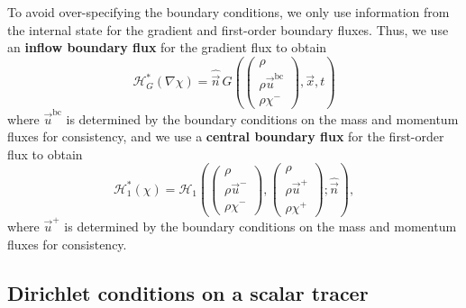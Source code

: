 \documentclass{report}
\numberwithin{equation}{section}
\begin{document}
To avoid over-specifying the boundary conditions, we only use information from the internal state for the gradient and first-order boundary fluxes. Thus, we use an \textbf{inflow boundary flux} for the gradient flux to obtain
\begin{equation}
    \mathcal{H}_G^*(\nabla \chi) = \hat{\vec n } \, G \left( \begin{pmatrix} \rho \\ \rho \vec u^{\text{bc}} \\ \rho \chi^- \end{pmatrix}, \vec x, t \right)
\end{equation}
where $\vec u^{\text{bc}}$ is determined by the boundary conditions on the mass and momentum fluxes for consistency, and we use a \textbf{central boundary flux} for the first-order flux to obtain
\begin{equation}
    \mathcal{H}_1^*(\chi) = \mathcal{H}_1 \left(
        \begin{pmatrix} \rho \\ \rho \vec u^- \\ \rho \chi^- \end{pmatrix}, 
        \begin{pmatrix} \rho \\ \rho \vec u^+ \\ \rho \chi^+ \end{pmatrix}; 
        \hat{\vec n }
    \right),
\end{equation}
where $\vec u^+$ is determined by the boundary conditions on the mass and momentum fluxes for consistency. 

\subsection{Dirichlet conditions on a scalar tracer}
\end{document}
